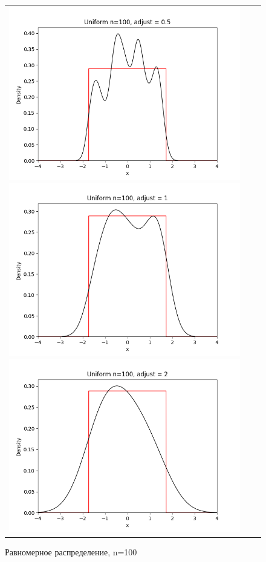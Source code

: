 \begin{figure}[H]
	\begin{tabular}{ccc}
		\includegraphics[scale=0.33]{uniform_n100_adjust0.5.png}
		\includegraphics[scale=0.33]{uniform_n100_adjust1.png}
		\includegraphics[scale=0.33]{uniform_n100_adjust2.png}
	\end{tabular}
	\caption{Равномерное распределение, n=100}
\end{figure}


